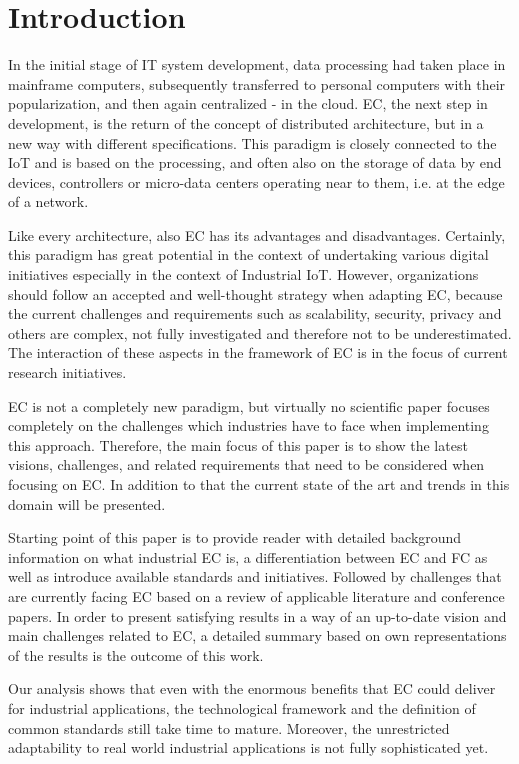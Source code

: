 \section{Introduction}\label{sec:introduction}
In the initial stage of IT system development, data processing had taken place in mainframe computers, subsequently transferred to personal computers with their popularization, and then again centralized - in the cloud. EC, the next step in development, is the return of the concept of distributed architecture, but in a new way with different specifications. This paradigm is closely connected to the IoT and is based on the processing, and often also on the storage of data by end devices, controllers or micro-data centers operating near to them, i.e. at the edge of a network.\par 
Like every architecture, also EC has its advantages and disadvantages. Certainly, this paradigm has great potential in the context of undertaking various digital initiatives especially in the context of Industrial IoT. However, organizations should follow an accepted and well-thought strategy when adapting EC, because the current challenges and requirements such as scalability, security, privacy and others are complex, not fully investigated and therefore not to be underestimated. The interaction of these aspects in the framework of EC is in the focus of current research initiatives.\par
EC is not a completely new paradigm, but virtually no scientific paper focuses completely on the challenges which industries have to face when implementing this approach. Therefore, the main focus of this paper is to show the latest visions, challenges, and related requirements that need to be considered when focusing on EC. In addition to that the current state of the art and trends in this domain will be presented. \par
Starting point of this paper is to provide reader with detailed background information on what industrial EC is, a differentiation between EC and FC as well as introduce available standards and initiatives. Followed by challenges that are currently facing EC based on a review of applicable literature and conference papers. In order to present satisfying results in a way of an up-to-date vision and main challenges related to EC, a detailed summary based on own representations of the results is the outcome of this work. \par
Our analysis shows that even with the enormous benefits that EC could deliver for industrial applications, the technological framework and the definition of common standards still take time to mature. Moreover, the unrestricted adaptability to real world industrial applications is not fully sophisticated yet.\par 
